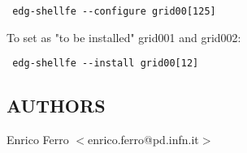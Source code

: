 \begin{verbatim}
 edg-shellfe --configure grid00[125]
\end{verbatim}


To set as "to be installed" grid001 and grid002:

\begin{verbatim}
 edg-shellfe --install grid00[12]
\end{verbatim}
\subsection*{AUTHORS\label{edg-shellfe_AUTHORS}}


Enrico Ferro $<$enrico.ferro@pd.infn.it$>$

